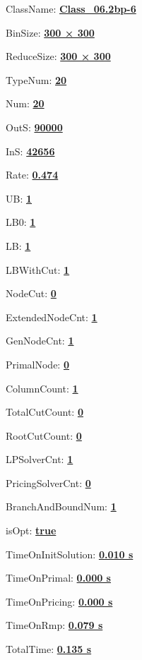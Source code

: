 \documentclass[11pt]{article}
\begin{document}
\pagestyle{empty}


ClassName: \underline{\textbf{Class_06.2bp-6}}
\par
BinSize: \underline{\textbf{300 × 300}}
\par
ReduceSize: \underline{\textbf{300 × 300}}
\par
TypeNum: \underline{\textbf{20}}
\par
Num: \underline{\textbf{20}}
\par
OutS: \underline{\textbf{90000}}
\par
InS: \underline{\textbf{42656}}
\par
Rate: \underline{\textbf{0.474}}
\par
UB: \underline{\textbf{1}}
\par
LB0: \underline{\textbf{1}}
\par
LB: \underline{\textbf{1}}
\par
LBWithCut: \underline{\textbf{1}}
\par
NodeCut: \underline{\textbf{0}}
\par
ExtendedNodeCnt: \underline{\textbf{1}}
\par
GenNodeCnt: \underline{\textbf{1}}
\par
PrimalNode: \underline{\textbf{0}}
\par
ColumnCount: \underline{\textbf{1}}
\par
TotalCutCount: \underline{\textbf{0}}
\par
RootCutCount: \underline{\textbf{0}}
\par
LPSolverCnt: \underline{\textbf{1}}
\par
PricingSolverCnt: \underline{\textbf{0}}
\par
BranchAndBoundNum: \underline{\textbf{1}}
\par
isOpt: \underline{\textbf{true}}
\par
TimeOnInitSolution: \underline{\textbf{0.010 s}}
\par
TimeOnPrimal: \underline{\textbf{0.000 s}}
\par
TimeOnPricing: \underline{\textbf{0.000 s}}
\par
TimeOnRmp: \underline{\textbf{0.079 s}}
\par
TotalTime: \underline{\textbf{0.135 s}}
\par
\newpage
\end{document}
